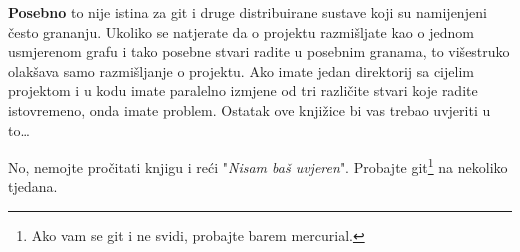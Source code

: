 \textbf{Posebno} to nije istina za git i druge distribuirane sustave koji su namijenjeni često grananju.
Ukoliko se natjerate da o projektu razmišljate kao o jednom usmjerenom grafu i tako posebne stvari radite u posebnim granama, to višestruko olakšava samo razmišljanje o projektu.
Ako imate jedan direktorij sa cijelim projektom i u kodu imate paralelno izmjene od tri različite stvari koje radite istovremeno, onda imate problem.
Ostatak ove knjižice bi vas trebao uvjeriti u to\dots

No, nemojte pročitati knjigu i reći "\emph{Nisam baš uvjeren}". 
Probajte git\footnote{Ako vam se git i ne svidi, probajte barem mercurial.} na nekoliko tjedana.

